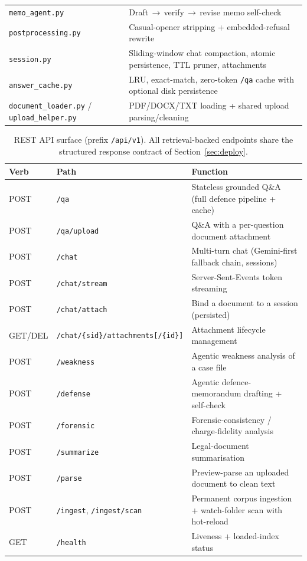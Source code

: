 \documentclass[final,1p,times]{elsarticle}
\newcommand{\thead}[1]{\textbf{#1}}                 %
\begin{document}
\begin{table}[!htb]
\begin{tabular}{L{3.4cm} L{10.6cm}}
\texttt{memo\_agent.py} & Draft\,$\rightarrow$\,verify\,$\rightarrow$\,revise memo self-check \\
\texttt{postprocessing.py} & Casual-opener stripping + embedded-refusal rewrite \\
\texttt{session.py} & Sliding-window chat compaction, atomic persistence, TTL pruner, attachments \\
\texttt{answer\_cache.py} & LRU, exact-match, zero-token \texttt{/qa} cache with optional disk persistence \\
\texttt{document\_loader.py} / \texttt{upload\_helper.py} & PDF/DOCX/TXT loading + shared upload parsing/cleaning \\
\bottomrule
\end{tabular}
\end{table}

\begin{table}[!htb]
\centering
\small
\caption{REST API surface (prefix \texttt{/api/v1}). All retrieval-backed
endpoints share the structured response contract of Section~\ref{sec:deploy}.}
\label{tab:endpoints}
\setlength{\tabcolsep}{5pt}
\renewcommand{\arraystretch}{1.20}
\begin{tabular}{L{1.2cm} L{4.6cm} L{8.2cm}}
\toprule
{}
\thead{Verb} & \thead{Path} & \thead{Function} \\
\midrule
POST & \texttt{/qa} & Stateless grounded Q\&A (full defence pipeline + cache) \\
POST & \texttt{/qa/upload} & Q\&A with a per-question document attachment \\
POST & \texttt{/chat} & Multi-turn chat (Gemini-first fallback chain, sessions) \\
POST & \texttt{/chat/stream} & Server-Sent-Events token streaming \\
POST & \texttt{/chat/attach} & Bind a document to a session (persisted) \\
GET/DEL & \texttt{/chat/\{sid\}/attachments[/\{id\}]} & Attachment lifecycle management \\
POST & \texttt{/weakness} & Agentic weakness analysis of a case file \\
POST & \texttt{/defense} & Agentic defence-memorandum drafting + self-check \\
POST & \texttt{/forensic} & Forensic-consistency / charge-fidelity analysis \\
POST & \texttt{/summarize} & Legal-document summarisation \\
POST & \texttt{/parse} & Preview-parse an uploaded document to clean text \\
POST & \texttt{/ingest}, \texttt{/ingest/scan} & Permanent corpus ingestion + watch-folder scan with hot-reload \\
GET & \texttt{/health} & Liveness + loaded-index status \\
\bottomrule
\end{tabular}
\end{table}
\end{document}
